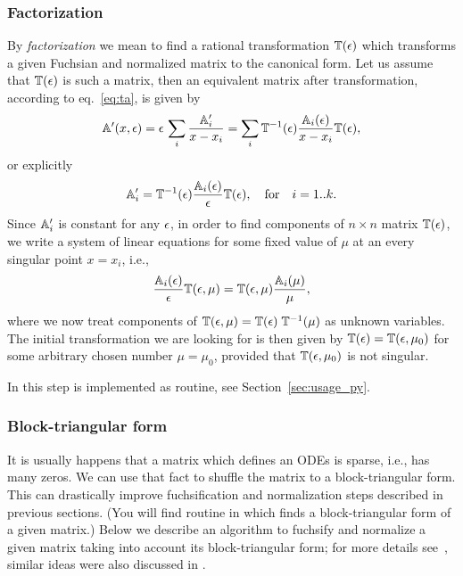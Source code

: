 \documentclass[12pt,a4paper]{article}
\begin{document}
\subsubsection{Factorization}
\label{sec:fact}
By {\em factorization} we mean to find a rational transformation $\mathbb{T}(\epsilon)$ which transforms a given Fuchsian and normalized matrix to the canonical form.
Let us assume that $\mathbb{T}(\epsilon)$ is such a matrix, then an equivalent matrix after transformation, according to eq.~\eqref{eq:ta}, is given by
\begin{equation}
  \mathbb{A}'(x,\epsilon) = \epsilon\, \sum_i \frac{\mathbb{A}'_i}{x-x_i} = \sum_i \mathbb{T}^{-1}(\epsilon) \frac{\mathbb{A}_i(\epsilon)}{x-x_i} \mathbb{T}(\epsilon),
\end{equation}
or explicitly
\begin{equation}
  \mathbb{A}'_i = \mathbb{T}^{-1}(\epsilon) \frac{\mathbb{A}_i(\epsilon)}{\epsilon} \mathbb{T}(\epsilon), \quad \text{for} \quad i=1..k.
\end{equation}
Since $\mathbb{A}'_i$ is constant for any $\epsilon$, in order to find components of $n\times n$ matrix $\mathbb{T}(\epsilon)$, we write a system of linear equations for some fixed value of $\mu$ at an every singular point $x=x_i$, i.e.,
\begin{equation}
  \frac{\mathbb{A}_i(\epsilon)}{\epsilon} \mathbb{T}(\epsilon,\mu) = \mathbb{T}(\epsilon,\mu) \frac{\mathbb{A}_i(\mu)}{\mu},
\end{equation}
where we now treat components of $\mathbb{T}(\epsilon,\mu) = \mathbb{T}(\epsilon) \; \mathbb{T}^{-1}(\mu)$ as unknown variables.
The initial transformation we are looking for is then given by $\mathbb{T}(\epsilon) = \mathbb{T}(\epsilon,\mu_0)$ for some arbitrary chosen number $\mu = \mu_0$, provided that $\mathbb{T}(\epsilon, \mu_0)$ is not singular.

In \fuchsia this step is implemented as  routine, see Section~\ref{sec:usage_py}.

\subsubsection{Block-triangular form}
\label{sec:blockreduce}

It is usually happens that a matrix which defines an ODEs is sparse, i.e., has many zeros.
We can use that fact to shuffle the matrix to a block-triangular form.
This can drastically improve fuchsification and normalization steps described in previous sections.
(You will find  routine in \fuchsia which finds a block-triangular form of a given matrix.)
Below we describe an algorithm to fuchsify and normalize a given matrix taking into account its block-triangular form; for more details see~\cite[Section~7]{Lee15}, similar ideas were also discussed in \cite{Git15}.
\end{document}
